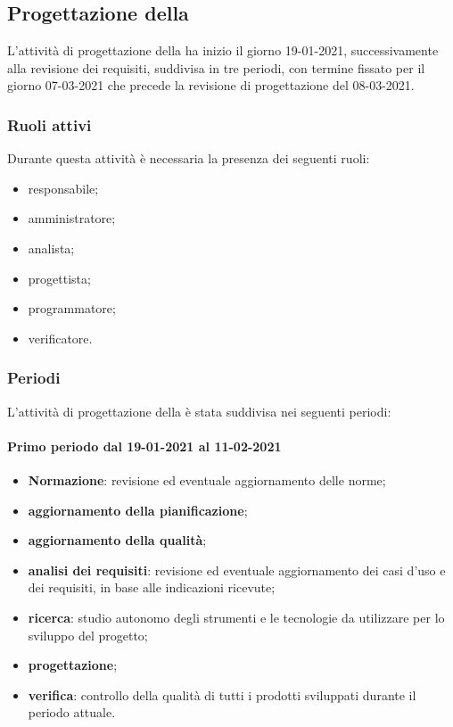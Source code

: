 \newpage %

\subsection{Progettazione della } 
L'attività di progettazione della  ha inizio il giorno 19-01-2021, successivamente alla revisione dei requisiti, suddivisa in tre periodi, con termine fissato per il giorno 07-03-2021 che precede la revisione di progettazione del 08-03-2021. 

\subsubsection{Ruoli attivi} 
Durante questa attività è necessaria la presenza dei seguenti ruoli: 
\begin{itemize} 
	\item responsabile; 
	\item amministratore; 
	\item analista; 
	\item progettista; 
	\item programmatore; 
	\item verificatore.
\end{itemize} 

\subsubsection{Periodi} 
L'attività di progettazione della  è stata suddivisa nei seguenti periodi: 

\paragraph{Primo periodo dal 19-01-2021 al 11-02-2021} 
\begin{itemize} 
	\item \textbf{Normazione}: revisione ed eventuale aggiornamento delle norme; 
	\item \textbf{aggiornamento della pianificazione}; 
	\item \textbf{aggiornamento della qualità}; 
	\item \textbf{analisi dei requisiti}: revisione ed eventuale aggiornamento dei casi d’uso e dei requisiti, in base alle indicazioni ricevute; 
	\item \textbf{ricerca}: studio autonomo degli strumenti e le tecnologie da utilizzare per lo sviluppo del 
	progetto; 
	\item \textbf{progettazione}; 
	\item \textbf{verifica}: controllo della qualità di tutti i prodotti sviluppati durante il periodo attuale. 
\end{itemize} 

